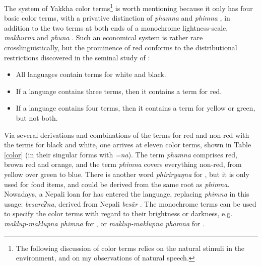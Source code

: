 The system of Yakkha color terms\footnote{The following discussion of color terms relies on the natural stimuli in the environment, and on my observations of natural speech.} is worth mentioning because it only has four basic color terms, with a privative distinction of \emph{phamna}  and \emph{phimna} , in addition to the two terms at both ends of a monochrome lightness-scale, \emph{makhurna}  and \emph{phuna} . Such an economical system is rather rare crosslinguistically, but the prominence of red conforms to the distributional restrictions discovered in the seminal study of \citet[2-3]{Berlinetal1969Basic}: 

\begin{itemize}
\item All languages contain terms for white and black.
\item If a language contains three terms, then it contains a term for red. 
\item If a language contains four terms, then it contains a term for yellow or green, but not both.
\end{itemize}

Via several derivations and combinations of the terms for red and non-red with the terms for black and white, one arrives at eleven color terms, shown in Table \ref{color} (in their singular forms with \emph{=na}). The term \emph{phamna} comprises  red, brown red and orange, and the term \emph{phimna} covers everything non-red, from yellow over green to blue. There is another word \emph{phiriryaŋna} for , but it is only used for food items, and could be derived from the same root as \emph{phimna}. Nowadays, a Nepali loan for  has entered the language, replacing \emph{phimna} in this usage: \emph{besareʔna}, derived from Nepali \emph{besār} .   The monochrome terms can be used to specify the color terms with regard to their brightness or darkness, e.g. \emph{maklup-maklupna phimna} for , or \emph{maklup-maklupna phamna} for . 



